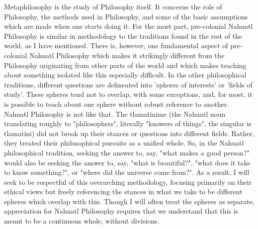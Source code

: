 Metaphilosophy is the study of Philosophy itself. It concerns the role of Philosophy, the methods used in Philosophy, and some of the basic assumptions which are made when one starts doing it. For the most part, pre-colonial Nahuatl Philosophy is similar in methodology to the traditions found in the rest of the world, as I have mentioned. There is, however, one fundamental aspect of pre-colonial Nahuatl Philosophy which makes it strikingly different from the Philosophy originating from other parts of the world and which makes teaching about something isolated like this especially difficult. In the other philosophical traditions, different questions are delineated into 'spheres of interests' or 'fields of study'. These spheres tend not to overlap, with some exceptions, and, for most, it is possible to teach about one sphere without robust reference to another. Nahuatl Philosophy is not like that. The tlamatinime (the Nahuatl noun translating roughly to "philosophers", literally "knowers of things", the singular is tlamatini) did not break up their stances or questions into different fields. Rather, they treated their philosophical pursuits as a unified whole. So, in the Nahuatl philosophical tradition, seeking the answer to, say, "what makes a good person?" would also be seeking the answer to, say, "what is beautiful?", "what does it take to know something?", or "where did the universe come from?". As a result, I will seek to be respectful of this overarching methodology, focusing primarily on their ethical views but freely referencing the stances in what we take to be different spheres which overlap with this. Though I will often treat the spheres as separate, appreciation for Nahuatl Philosophy requires that we understand that this is meant to be a continuous whole, without divisions.


